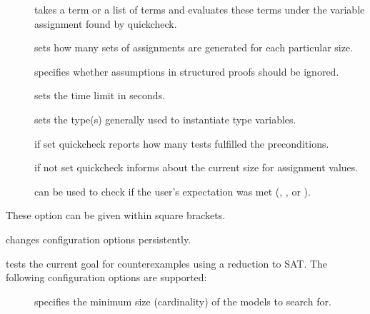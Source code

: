 \begin{isabellebody}
\begin{isamarkuptext}
\begin{description}
\begin{description}
    \item[] takes a term or a list of terms and evaluates
      these terms under the variable assignment found by quickcheck.

    \item[] sets how many sets of assignments are
    generated for each particular size.

    \item[] specifies whether assumptions in
    structured proofs should be ignored.

    \item[] sets the time limit in seconds.

    \item[] sets the type(s) generally used to
    instantiate type variables.

    \item[] if set quickcheck reports how many tests
    fulfilled the preconditions.

    \item[] if not set quickcheck informs about the
    current size for assignment values.

    \item[] can be used to check if the user's
    expectation was met (, , or ).

    \end{description}

    These option can be given within square brackets.

  \item \hyperlink{command.HOL.quickcheck-params}{\mbox{}} changes
    \hyperlink{command.HOL.quickcheck}{\mbox{}} configuration options persistently.

  \item \hyperlink{command.HOL.refute}{\mbox{}} tests the current goal for
    counterexamples using a reduction to SAT. The following configuration
    options are supported:

    \begin{description}

    \item[] specifies the minimum size (cardinality) of the
      models to search for.


\end{description}
\end{description}
\end{isamarkuptext}
\end{isabellebody}
